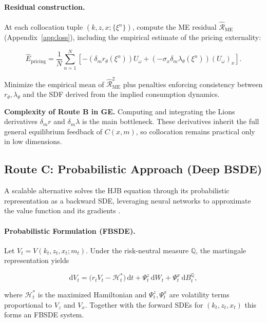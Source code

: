 \documentclass[11pt,letterpaper,oneside]{article}
\begin{document}
\paragraph{Residual construction.}
At each collocation tuple $(k,z,x;\{\xi^n\})$, compute the ME residual $\widehat{\mathcal{R}}_{\mathrm{ME}}$ (Appendix~\ref{app:loss}), including the empirical estimate of the pricing externality:

$$
\widehat E_{\text{pricing}} = \frac{1}{N}\sum_{n=1}^N \left[ -(\delta_m r_\theta(\xi^n)) U_\omega + (-\sigma_x \delta_m \lambda_\theta(\xi^n)) (U_\omega)_x \right].
$$

Minimize the empirical mean of $\widehat{\mathcal{R}}_{\mathrm{ME}}^2$ plus penalties enforcing consistency between $r_\theta, \lambda_\theta$ and the SDF derived from the implied consumption dynamics.

\begin{tcolorbox}[mathstyle]
\textbf{Complexity of Route B in GE.} Computing and integrating the Lions derivatives $\delta_m r$ and $\delta_m \lambda$ is the main bottleneck. These derivatives inherit the full general equilibrium feedback of $C(x,m)$, so collocation remains practical only in low dimensions.
\end{tcolorbox}

\subsection{Route C: Probabilistic Approach (Deep BSDE)}\label{sec:routeC}

A scalable alternative solves the HJB equation through its probabilistic representation as a backward SDE, leveraging neural networks to approximate the value function and its gradients \cite{huang_2025_probabilistic}.

\paragraph{Probabilistic Formulation (FBSDE).} Let $V_t = V(k_t,z_t,x_t; m_t)$. Under the risk-neutral measure $\mathbb{Q}$, the martingale representation yields

\begin{equation}\label{eq:BSDE_V}
\mathrm{d}V_t = \big(r_t V_t - \mathcal{H}^*_t\big)\,\mathrm{d}t + \Psi_t^z\,\mathrm{d}W_t + \Psi_t^x\,\mathrm{d}B_t^{\mathbb{Q}},
\end{equation}

where $\mathcal{H}^*_t$ is the maximized Hamiltonian and $\Psi_t^z, \Psi_t^x$ are volatility terms proportional to $V_z$ and $V_x$. Together with the forward SDEs for $(k_t,z_t,x_t)$ this forms an FBSDE system.
\end{document}
